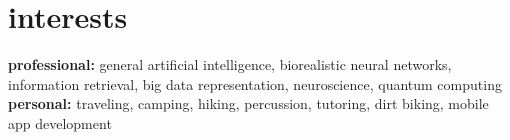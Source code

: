 \documentclass[]{friggeri-cv} %
\begin{document}

\section{interests}

\textbf{professional:} general artificial intelligence, biorealistic neural networks, information retrieval, big data representation, neuroscience, quantum computing \textbf{personal:} traveling, camping, hiking, percussion, tutoring, dirt biking, mobile app development
\end{document}
